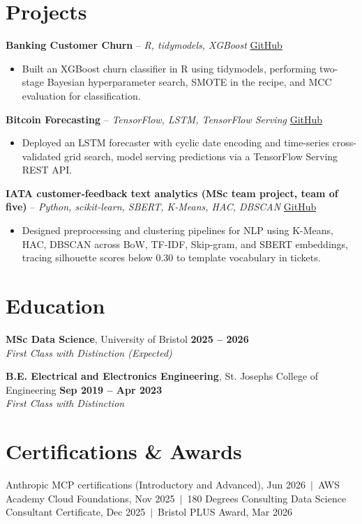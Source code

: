 \documentclass[a4paper,11pt]{article}
\begin{document}
\section{Projects}
\noindent\textbf{Banking Customer Churn} -- \textit{R, tidymodels, XGBoost} \hfill \href{https://github.com/Thiruvel-AP/Banking-Customer-Churn-Prediction}{GitHub}
\begin{itemize}
  \item Built an XGBoost churn classifier in R using tidymodels, performing two-stage Bayesian hyperparameter search, SMOTE in the recipe, and MCC evaluation for classification.
\end{itemize}
\vspace{3pt}
\noindent\textbf{Bitcoin Forecasting} -- \textit{TensorFlow, LSTM, TensorFlow Serving} \hfill \href{https://github.com/Thiruvel-AP/BitcoinForecasting}{GitHub}
\begin{itemize}
  \item Deployed an LSTM forecaster with cyclic date encoding and time-series cross-validated grid search, model serving predictions via a TensorFlow Serving REST API.
\end{itemize}
\vspace{3pt}
\noindent\textbf{IATA customer-feedback text analytics (MSc team project, team of five)} -- \textit{Python, scikit-learn, SBERT, K-Means, HAC, DBSCAN} \hfill \href{https://github.com/Thiruvel-AP/TextAnalytics}{GitHub}
\begin{itemize}
  \item Designed preprocessing and clustering pipelines for NLP using K-Means, HAC, DBSCAN across BoW, TF-IDF, Skip-gram, and SBERT embeddings, tracing silhouette scores below 0.30 to template vocabulary in tickets.
\end{itemize}

\section{Education}
\textbf{MSc Data Science}, University of Bristol \hfill \textbf{2025 – 2026}\\ \textit{First Class with Distinction (Expected)}\par
\vspace{3pt}
\textbf{B.E. Electrical and Electronics Engineering}, St. Joseph\textquotesingle{}s College of Engineering \hfill \textbf{Sep 2019 – Apr 2023}\\ \textit{First Class with Distinction}\par

\section{Certifications \& Awards}
Anthropic MCP certifications (Introductory and Advanced), Jun 2026 \,$|$\, AWS Academy Cloud Foundations, Nov 2025 \,$|$\, 180 Degrees Consulting Data Science Consultant Certificate, Dec 2025 \,$|$\, Bristol PLUS Award, Mar 2026
\end{document}
